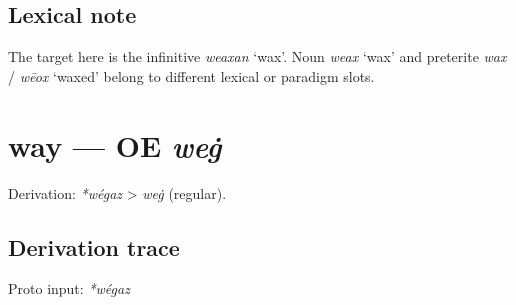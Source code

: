 \documentclass[
  british,
  a4paper,
  openany]{book}
\providecommand{\texorpdfstring}[2]{#1}
\begin{document}
\subsection{Lexical note}\label{lexical-note-3}

The target here is the infinitive \emph{weaxan} `wax'. Noun \emph{weax}
`wax' and preterite \emph{wax} / \emph{wēox} `waxed' belong to different
lexical or paradigm slots.

\section{\texorpdfstring{way --- OE
\emph{weġ}}{way --- OE weġ}}\label{way-oe-weux121}


Derivation: \emph{*wégaz} \textgreater{} \emph{weġ} (regular).

\subsection{Derivation trace}\label{derivation-trace-64}

Proto input: \emph{*wégaz}

\begingroup
\setlength{\fboxsep}{6pt}
\end{document}
